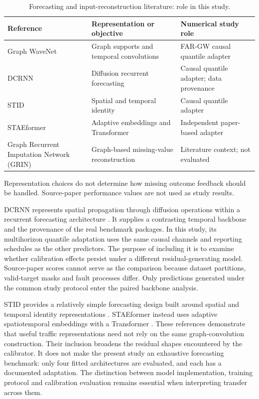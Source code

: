 \documentclass[pdflatex,sn-mathphys-num]{sn-jnl}
\begin{document}
\begin{table}[!htbp]\caption{Forecasting and input-reconstruction literature: role in this study.}\label{tab:related-models}\centering\setlength{\tabcolsep}{3pt}\small
\begin{tabular}{>{\raggedright\arraybackslash}p{}>{\raggedright\arraybackslash}p{}>{\raggedright\arraybackslash}p{}}\toprule
Reference & Representation or objective & Numerical study role \\\midrule
Graph WaveNet \citep{wu2019} & Graph supports and temporal convolutions & FAR-GW causal quantile adapter \\
DCRNN \citep{li2018} & Diffusion recurrent forecasting & Causal quantile adapter; data provenance \\
STID \citep{shao2022} & Spatial and temporal identity & Causal quantile adapter \\
STAEformer \citep{liu2023} & Adaptive embeddings and Transformer & Independent paper-based adapter \\
Graph Recurrent Imputation Network (GRIN) \citep{cini2022} & Graph-based missing-value reconstruction & Literature context; not evaluated \\
\bottomrule\end{tabular}\par\smallskip\footnotesize Representation choices do not determine how missing outcome feedback should be handled. Source-paper performance values are not used as study results.\end{table}
\FloatBarrier

DCRNN represents spatial propagation through diffusion operations within a recurrent forecasting architecture \citep{li2018}. It supplies a contrasting temporal backbone and the provenance of the real benchmark packages. In this study, its multihorizon quantile adaptation uses the same causal channels and reporting schedules as the other predictors. The purpose of including it is to examine whether calibration effects persist under a different residual-generating model. Source-paper scores cannot serve as the comparison because dataset partitions, valid-target masks and fault processes differ. Only predictions generated under the common study protocol enter the paired backbone analysis.

STID provides a relatively simple forecasting design built around spatial and temporal identity representations \citep{shao2022}. STAEformer instead uses adaptive spatiotemporal embeddings with a Transformer \citep{liu2023}. These references demonstrate that useful traffic representations need not rely on the same graph-convolution construction. Their inclusion broadens the residual shapes encountered by the calibrator. It does not make the present study an exhaustive forecasting benchmark: only four fitted architectures are evaluated, and each has a documented adaptation. The distinction between model implementation, training protocol and calibration evaluation remains essential when interpreting transfer across them.
\end{document}
